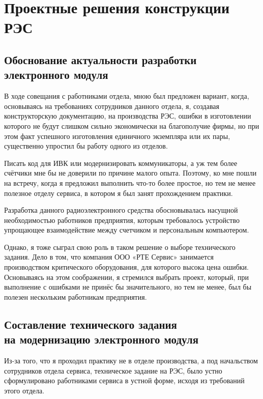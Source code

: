\section{Проектные решения конструкции РЭС}

\subsection{Обоснование актуальности разработки \\
  электронного модуля}

В ходе совещания с работниками отдела,
мною был предложен вариант,
когда, основываясь на требованиях сотрудников данного
отдела, я, создавая конструкторскую документацию,
на производства РЭС, ошибки в изготовлении которого не будут
слишком сильно экономически на благополучие фирмы,
но при этом факт успешного изготовления
единичного экземпляра или их пары,
существенно упростил бы работу одного из отделов.

Писать код для ИВК или модернизировать коммуникаторы,
а уж тем более счётчики мне бы не доверили по причине
малого опыта. Поэтому, ко мне пошли на встречу, когда
я предложил выполнить что-то более простое,
но тем не менее полезное отделу сервиса,
в котором я был занят прохождением практики.


Разработка данного радиоэлектронного средства обосновывалась
насущной необходимостью работников предприятия,
которым требовалось устройство упрощающее взаимодействие
между счетчиком и персональным компьютером.

Однако, я тоже сыграл свою роль в таком решение о выборе технического задания.
Дело в том, что компания ООО «РТЕ Сервис» занимается производством
критического оборудования, для которого высока цена ошибки.
Основываясь на этом соображении,
я стремился выбрать проект,
который,
при выполнение с ошибками не принёс бы значительного,
но тем не менее, был бы полезен нескольким работникам предприятия.

\subsection{Составление технического задания\\
  на модернизацию электронного модуля}

Из-за того, 
что я проходил практику не в отделе производства,
а под начальством сотрудников отдела сервиса,
техническое задание на РЭС,
было устно сформулировано работниками сервиса
в устной форме, исходя из требований этого отдела.

